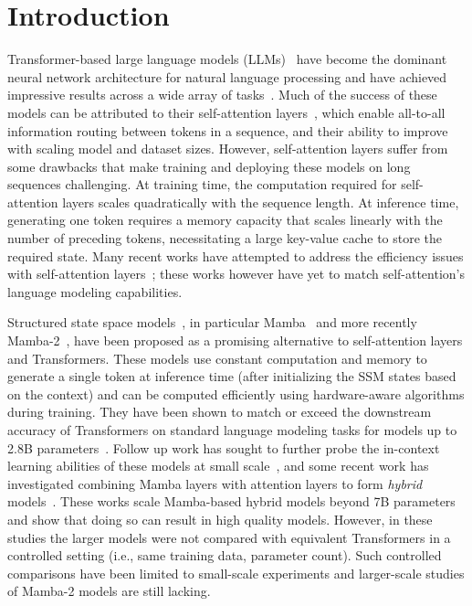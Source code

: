 \section{Introduction}

Transformer-based large language models (LLMs)~\citep{vaswani2017attention} have become the dominant neural network architecture for natural language processing and have achieved impressive results across a wide array of tasks~\citep{achiam2023gpt, touvron2023llama}. Much of the success of these models can be attributed to their self-attention layers~\citep{bahdanau2014neural}, which enable all-to-all information routing between tokens in a sequence, and their ability to improve with scaling model and dataset sizes. However, self-attention layers suffer from some drawbacks that make training and deploying these models on long sequences challenging. At training time, the computation required for self-attention layers scales quadratically with the sequence length. At inference time, generating one token requires a memory capacity that scales linearly with the number of preceding tokens, necessitating a large key-value cache to store the required state. Many recent works have attempted to address the efficiency issues with self-attention layers~\citep{tay2022efficient}; these works however have yet to match self-attention's language modeling capabilities.

Structured state space models~\citep{gu2021efficiently}, in particular Mamba~\citep{gu2023mamba} and more recently Mamba-2~\citep{dao2024transformers}, have been proposed as a promising alternative to self-attention layers and Transformers. These models use constant computation and memory to generate a single token at inference time (after initializing the SSM states based on the context) and can be computed efficiently using hardware-aware algorithms during training. They have been shown to match or exceed the downstream accuracy of Transformers on standard language modeling tasks for models up to 2.8B parameters~\citep{gu2023mamba, dao2024transformers}. Follow up work has sought to further probe the in-context learning abilities of these models at small scale~\citep{park2024can}, and some recent work has investigated combining Mamba layers with attention layers to form \textit{hybrid} models~\citep{glorioso2024zamba, lieber2024jamba}. These works scale Mamba-based hybrid models beyond 7B parameters and show that doing so can result in high quality models. However, in these studies the larger models were not compared with equivalent Transformers in a controlled setting (i.e., same training data, parameter count). Such controlled comparisons have been limited to small-scale experiments and larger-scale studies of Mamba-2 models are still lacking.

